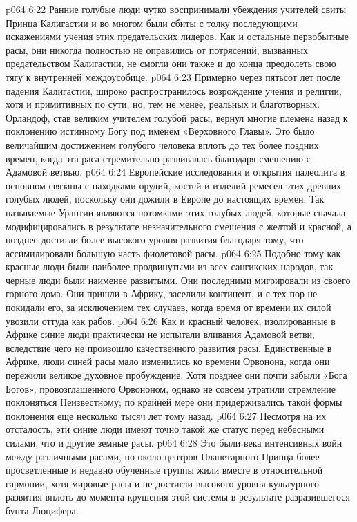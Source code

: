\vs p064 6:22 Ранние голубые люди чутко воспринимали убеждения учителей свиты Принца Калигастии и во многом были сбиты с толку последующими искажениями учения этих предательских лидеров. Как и остальные первобытные расы, они никогда полностью не оправились от потрясений, вызванных предательством Калигастии, не смогли они также и до конца преодолеть свою тягу к внутренней междоусобице.
\vs p064 6:23 Примерно через пятьсот лет после падения Калигастии, широко распространилось возрождение учения и религии, хотя и примитивных по сути, но, тем не менее, реальных и благотворных. Орландоф, став великим учителем голубой расы, вернул многие племена назад к поклонению истинному Богу под именем «Верховного Главы». Это было величайшим достижением голубого человека вплоть до тех более поздних времен, когда эта раса стремительно развивалась благодаря смешению с Адамовой ветвью.
\vs p064 6:24 Европейские исследования и открытия палеолита в основном связаны с находками орудий, костей и изделий ремесел этих древних голубых людей, поскольку они дожили в Европе до настоящих времен. Так называемые  Урантии являются потомками этих голубых людей, которые сначала модифицировались в результате незначительного смешения с желтой и красной, а позднее достигли более высокого уровня развития благодаря тому, что ассимилировали большую часть фиолетовой расы.
\vs p064 6:25 \pc {}\bibnobreakspace {} Подобно тому как красные люди были наиболее продвинутыми из всех сангикских народов, так черные люди были наименее развитыми. Они последними мигрировали из своего горного дома. Они пришли в Африку, заселили континент, и с тех пор не покидали его, за исключением тех случаев, когда время от времени их силой увозили оттуда как рабов.
\vs p064 6:26 Как и красный человек, изолированные в Африке синие люди практически не испытали вливания Адамовой ветви, вследствие чего не произошло качественного развития расы. Единственные в Африке, люди синей расы мало изменились ко времени Орвонона, когда они пережили великое духовное пробуждение. Хотя позднее они почти забыли «Бога Богов», провозглашенного Орвононом, однако не совсем утратили стремление поклоняться Неизвестному; по крайней мере они придерживались такой формы поклонения еще несколько тысяч лет тому назад.
\vs p064 6:27 Несмотря на их отсталость, эти синие люди имеют точно такой же статус перед небесными силами, что и другие земные расы.
\vs p064 6:28 \pc Это были века интенсивных войн между различными расами, но около центров Планетарного Принца более просветленные и недавно обученные группы жили вместе в относительной гармонии, хотя мировые расы и не достигли высокого уровня культурного развития вплоть до момента крушения этой системы в результате разразившегося бунта Люцифера.
